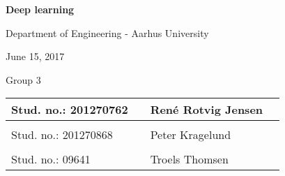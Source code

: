 
\centerline{\Huge\bfseries\color{ThemeColor} Deep learning}

\vspace{5em}
\centerline{\large\bfseries\color{BlackColor}}
\vspace{0.5em}
\centerline{\large\color{BlackColor}Department of Engineering - Aarhus University}

\vspace{0.5em}
\centerline{\large\color{BlackColor} June 15, 2017}
\vspace{0.5em}
\centerline{\large\color{BlackColor} Group 3}



\vspace{25em}

\begin{center}
	\centerline{\large\color{BlackColor} }
	\vspace{5em}
   \begin{tabular}{ l p{3cm} l l }
    Stud. no.: 201270762 && René Rotvig Jensen & \\\hline
	& & \\
	Stud. no.: 201270868 && Peter Kragelund & \\\hline
	& & \\
	Stud. no.: 09641 && Troels Thomsen & \\\hline
   \end{tabular}
\end{center}
\thispagestyle{empty} %
\restoregeometry

